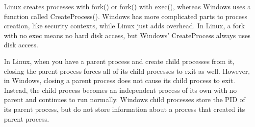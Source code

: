 \documentclass[10pt,draftclsnofoot,onecolumn,letterpaper]{IEEEtran}
\begin{document}
Linux creates processes with fork() or fork() with exec(), whereas Windows uses a function called CreateProcess(). Windows has more complicated parts to process creation, like security contexts, while Linux just adds overhead. In Linux, a fork with no exec means no hard disk access, but Windows' CreateProcess always uses disk access\cite{4}. \par
In Linux, when you have a parent process and create child processes from it, closing the parent process forces all of its child processes to exit as well. However, in Windows, closing a parent process does not cause its child process to exit. Instead, the child process becomes an independent process of its own with no parent and continues to run normally. Windows child processes store the PID of its parent process, but do not store information about a process that created its parent process. \par

\vspace{5mm}
\end{document}
